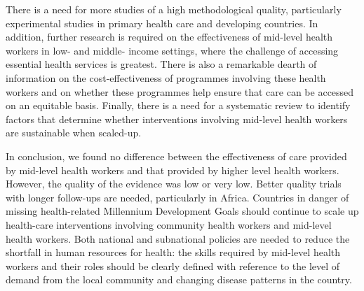 \documentclass{article}
\begin{document}
There is a need for more studies of a high methodological quality, particularly
experimental
studies in primary health care and developing countries. In addition, further
research is required
on the effectiveness of mid-level health workers in low- and middle- income
settings, where the
challenge of accessing essential health services is greatest. There is also a
remarkable dearth of
information on the cost-effectiveness of programmes involving these health
workers and on whether
these programmes help ensure that care can be accessed on an equitable basis.
Finally, there is a
need for a systematic review to identify factors that determine whether
interventions involving
mid-level health workers are sustainable when scaled-up.

In conclusion, we found no difference between the effectiveness of care provided
by mid-level
health workers and that provided by higher level health workers. However, the
quality of the
evidence was low or very low. Better quality trials with longer follow-ups are
needed, particularly
in Africa. Countries in danger of missing health-related Millennium Development
Goals should
continue to scale up health-care interventions involving community health
workers and mid-level
health workers. Both national and subnational policies are needed to reduce the
shortfall in human
resources for health: the skills required by mid-level health workers and their
roles should be
clearly defined with reference to the level of demand from the local community
and changing disease
patterns in the country.
\end{document}

